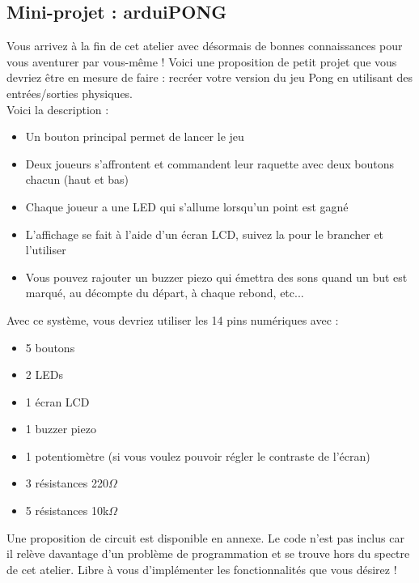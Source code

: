 \subsection{Mini-projet : arduiPONG}
Vous arrivez à la fin de cet atelier avec désormais de bonnes connaissances pour vous aventurer par vous-même !
Voici une proposition de petit projet que vous devriez être en mesure de faire : recréer votre version du jeu Pong en utilisant des entrées/sorties physiques.
\\
Voici la description :
\begin{itemize}
	\item Un bouton principal permet de lancer le jeu
	\item Deux joueurs s'affrontent et commandent leur raquette avec deux boutons chacun (haut et bas)
	\item Chaque joueur a une LED qui s'allume lorsqu'un point est gagné
	\item L'affichage se fait à l'aide d'un écran LCD, suivez la  pour le brancher et l'utiliser
	\item Vous pouvez rajouter un buzzer piezo qui émettra des sons quand un but est marqué, au décompte du départ, à chaque rebond, etc...
\end{itemize}

Avec ce système, vous devriez utiliser les 14 pins numériques avec :
\begin{itemize}
	\item 5 boutons
	\item 2 LEDs
	\item 1 écran LCD
	\item 1 buzzer piezo
	\item 1 potentiomètre (si vous voulez pouvoir régler le contraste de l'écran)
	\item 3 résistances 220$\Omega$
	\item 5 résistances 10k$\Omega$
\end{itemize}

Une proposition de circuit est disponible en annexe.
Le code n'est pas inclus car il relève davantage d'un problème de programmation et se trouve hors du spectre de cet atelier.
Libre à vous d'implémenter les fonctionnalités que vous désirez !